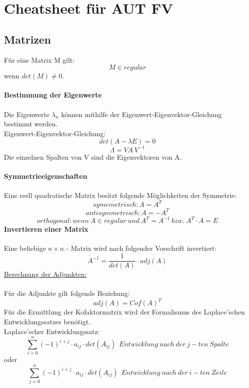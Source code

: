 \documentclass[12pt]{article}
\begin{document}
\section{Cheatsheet für AUT FV}
\subsection{Matrizen}
Für eine Matrix M gilt:
\[ M \in regul\ddot{a}r\] 
wenn $ det(M) \neq 0 $. \\ \\
\textbf{Bestimmung der Eigenwerte} \\ \\
Die Eigenwerte $ \lambda_{n} $ können mithilfe der Eigenwert-Eigenvektor-Gleichung bestimmt werden. \\
Eigenwert-Eigenvektor-Gleichung:
\[ det(A - \lambda E) = 0 \]
\[ \Lambda = VA \ V^{-1} \] 
Die einzelnen Spalten von V sind die Eigenvektoren von A. \\ \\
\textbf{Symmetrieeigenschaften}\\ \\
Eine reell quadratische Matrix besitzt folgende Möglichkeiten der Symmetrie:\\
\[ symemetrisch: A = A^{T}\]
\[ antisymmetrisch: A = -A^{T} \]
\[ orthogonal: wenn \ A \in regul\ddot{a}r \ und \ A^{T} = A^{-1} \ bzw.\  A^{T} \cdot A = E \]
\textbf{Invertieren einer Matrix} \\ \\
Eine beliebige $ n \times n $ - Matrix wird nach folgender Vorschrift invertiert: \\
\[ A^{-1} = \frac{1}{det(A)} \cdot adj(A) \]
\underline{Berechnung der Adjunkten:} \\ \\
Für die Adjunkte gilt folgende Beziehung:
\[ adj(A) = Cof(A)^{T} \]
Für die Ermittlung der Kofaktormatrix wird der Formalismus des Laplace'schen Entwicklungssatzes benötigt. \\
Laplace'scher Entwicklungssatz:
\[ \sum_{i=0}^{n}(-1)^{i+j} \cdot a_{ij} \cdot det(A_{ij}) \ \ Entwicklung \ nach \ der \ j-ten \ Spalte\]
oder
\[ \sum_{j=0}^{n}(-1)^{i+j} \cdot a_{ij} \cdot det(A_{ij}) \ \ Entwicklung \ nach \ der \ i-ten \ Zeile\]
\end{document}
